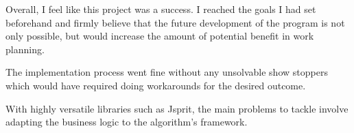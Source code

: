 Overall, I feel like this project was a success. I reached the goals I had set beforehand and firmly believe that the future development of the program is not only possible, but would increase the amount of potential benefit in work planning.

The implementation process went fine without any unsolvable show stoppers which would have required doing workarounds for the desired outcome.  

With highly versatile libraries such as Jsprit, the main problems to tackle involve adapting the business logic to the algorithm's framework.  